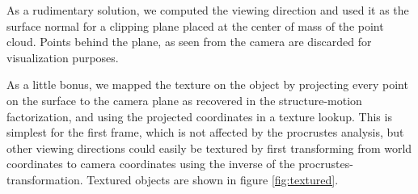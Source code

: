 \documentclass[a4paper,10pt]{article}
\begin{document}
As a rudimentary solution, we computed the viewing direction and used it as the surface normal for a clipping plane placed at the center of mass of the point cloud.
Points behind the plane, as seen from the camera are discarded for visualization purposes.

As a little bonus, we mapped the texture on the object by projecting every point on the surface to the camera plane as recovered in the structure-motion factorization, and using the projected coordinates in a texture lookup.
This is simplest for the first frame, which is not affected by the procrustes analysis, but other viewing directions could easily be textured by first transforming from world coordinates to camera coordinates using the inverse of the procrustes-transformation.
Textured objects are shown in figure \ref{fig:textured}.
\end{document}
